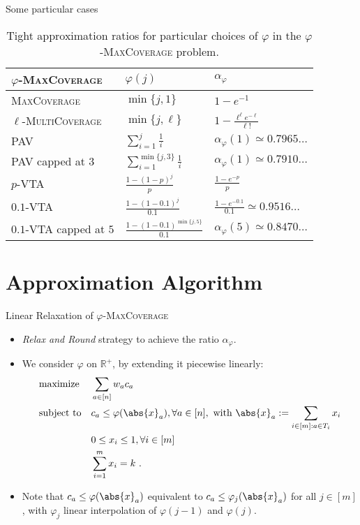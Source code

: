 \documentclass{beamer}
\theoremstyle{definition}
\theoremstyle{remark}
\DeclareMathOperator{\maxi}{\text{maximize}}
\DeclareMathOperator{\st}{\text{subject to}}
\begin{document}
\begin{frame}{Some particular cases}
  \begin{table}[!h]
  \begin{center}
    \begin{tabular}{|l|l|l|}
      \hline
      $\varphi$-\textsc{MaxCoverage}  & $\varphi(j)$ & $\alpha_{\varphi}$ \\
      \hline
      \textsc{MaxCoverage} & $\min \{ j,1\}$ & $1 - e^{-1}$  \\
      $\ell$-\textsc{MultiCoverage} & $\min\{ j,\ell\}$ & $1-\frac{\ell^{\ell}e^{-\ell}}{\ell!}$ \\
       \textsc{PAV} & $\sum_{i=1}^j \frac{1}{i}$ & $\alpha_{\varphi}(1) \simeq 0.7965\ldots$\\
      \textsc{PAV} capped at $3$ & $\sum_{i=1}^{\min\{j,3\}} \frac{1}{i}$ & $\alpha_{\varphi}(1) \simeq 0.7910\ldots$ \\
      $p$-\textsc{VTA} & $\frac{1-(1-p)^j}{p}$ & $\frac{1 - e^{-p}}{p}$  \\
      $0.1$-\textsc{VTA} & $\frac{1-(1-0.1)^j}{0.1}$ & $\frac{1 - e^{-0.1}}{0.1} \simeq 0.9516\ldots$ \\
      $0.1$-\textsc{VTA} capped at $5$ & $\frac{1-(1-0.1)^{\min\{j,5\}}}{0.1}$ & $\alpha_{\varphi}(5) \simeq 0.8470\ldots$  \\
      \hline
    \end{tabular}
  \end{center}
  \caption{Tight approximation ratios for particular choices of $\varphi$ in the $\varphi$-\textsc{MaxCoverage} problem.}
  \label{figComp}
\end{table}
\end{frame}

\section{Approximation Algorithm}
\begin{frame}{Linear Relaxation of $\varphi$-\textsc{MaxCoverage}}
  \begin{itemize}
  \item \emph{Relax and Round} strategy to achieve the ratio $\alpha_{\varphi}$.
    \pause
  \item We consider $\varphi$ on $\mathbb{R}^+$, by extending it piecewise linearly:  
  \begin{align*}
      &\maxi&& \sum_{a \in [n]} w_ac_a \\
      &\st&& c_a \leq \varphi(\abs{x}_a), \forall a \in [n],\text{ with }\abs{x}_a := \sum_{i \in [m] : a \in T_i} x_i\\
      &&& 0 \leq x_i \leq 1, \forall i \in [m]\\
      &&& \sum_{i=1}^m x_i = k \ .
  \end{align*}
  \pause
  
\item Note that $c_a \leq \varphi(\abs{x}_a)$ equivalent to $c_a \leq \varphi_j(\abs{x}_a)$ for all $j \in [m]$, with $\varphi_j$ linear interpolation of $\varphi(j-1)$ and $\varphi(j)$.
  \end{itemize}
  
\end{frame}
\end{document}
